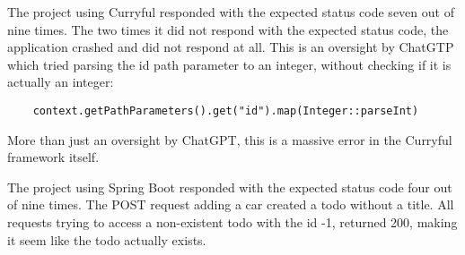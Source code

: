 \documentclass[a4paper]{article}
\begin{document}
\noindent The project using Curryful responded with the expected status code
seven out of nine times. The two times it did not respond with the expected
status code, the application crashed and did not respond at all. This is an
oversight by ChatGTP which tried parsing the id path parameter to an integer,
without checking if it is actually an integer:

\begin{verbatim}
	context.getPathParameters().get("id").map(Integer::parseInt)
\end{verbatim}

\noindent More than just an oversight by ChatGPT, this is a massive error in the
Curryful framework itself.
\newline

\noindent The project using Spring Boot responded with the expected status code
four out of nine times. The POST request adding a car created a todo without a
title. All requests trying to access a non-existent todo with the id -1,
returned 200, making it seem like the todo actually exists.
\end{document}
